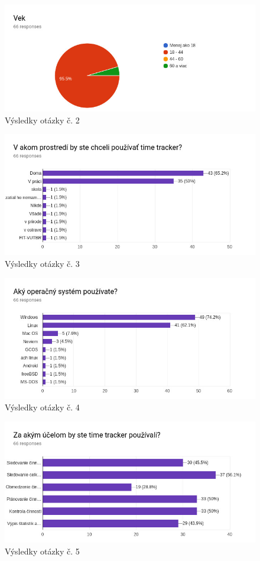 \documentclass[]{article}
\begin{document}
\begin{figure}[h!]
	\includegraphics[width=\textwidth]{otazka2}
	\caption{Výsledky otázky č. 2}
\end{figure}

\begin{figure}[h!]
	\includegraphics[width=\textwidth]{otazka3}
	\caption{Výsledky otázky č. 3}
\end{figure}

\begin{figure}[h!]
	\includegraphics[width=\textwidth]{otazka4}
	\caption{Výsledky otázky č. 4}
\end{figure}

\begin{figure}[h!]
	\includegraphics[width=\textwidth]{otazka5}
	\caption{Výsledky otázky č. 5}
\end{figure}
\end{document}
